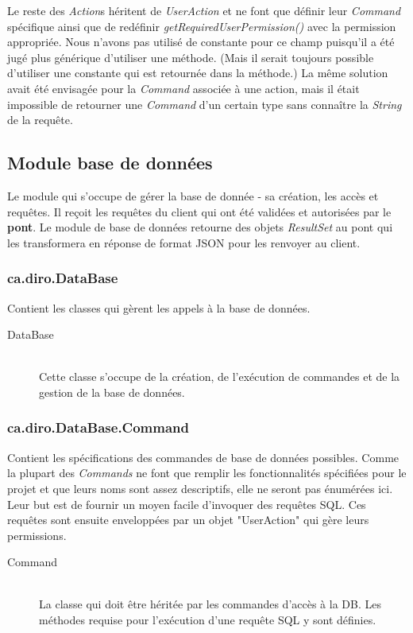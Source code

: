 \documentclass[10pt,a4paper]{report}
\begin{document}
\begin{flushleft}
\begin{description}
\end{description}
\bigskip
Le reste des \emph{Action}s héritent de \emph{UserAction} et ne font que définir leur \emph{Command} spécifique ainsi que de redéfinir \emph{getRequiredUserPermission()} avec la permission appropriée. Nous n'avons pas utilisé de constante pour ce champ puisqu'il a été jugé plus générique d'utiliser une méthode. (Mais il serait toujours possible d'utiliser une constante qui est retournée dans la méthode.) La même solution avait été envisagée pour la \emph{Command} associée à une action, mais il était impossible de retourner une \emph{Command} d'un certain type sans connaître la \emph{String} de la requête.\\
\bigskip
\subsection*{Module base de données}
Le module qui s'occupe de gérer la base de donnée - sa création, les accès et requêtes. Il reçoit les requêtes du client qui ont été validées et autorisées par le \textbf{pont}. Le module de base de données retourne des objets \emph{ResultSet} au pont qui les transformera en réponse de format JSON pour les renvoyer au client.\\
\bigskip
\subsubsection*{ca.diro.DataBase}
Contient les classes qui gèrent les appels à la base de données.\\
\begin{description}
\item[DataBase] \hfill \\ Cette classe s'occupe de la création, de l'exécution de commandes et de la gestion de la base de données.
\end{description}
\bigskip
\subsubsection*{ca.diro.DataBase.Command}
Contient les spécifications des commandes de base de données possibles. Comme la plupart des \emph{Commands} ne font que remplir les fonctionnalités spécifiées pour le projet et que leurs noms sont assez descriptifs, elle ne seront pas énumérées ici. Leur but est de fournir un moyen facile d'invoquer des requêtes SQL. Ces requêtes sont ensuite enveloppées par un objet "UserAction" qui gère leurs permissions.\\
\begin{description}
\item[Command] \hfill \\ La classe qui doit être héritée par les commandes d'accès à la DB. Les méthodes requise pour l'exécution d'une requête SQL y sont définies.
\end{description}
\bigskip

\end{flushleft}
\end{document}
